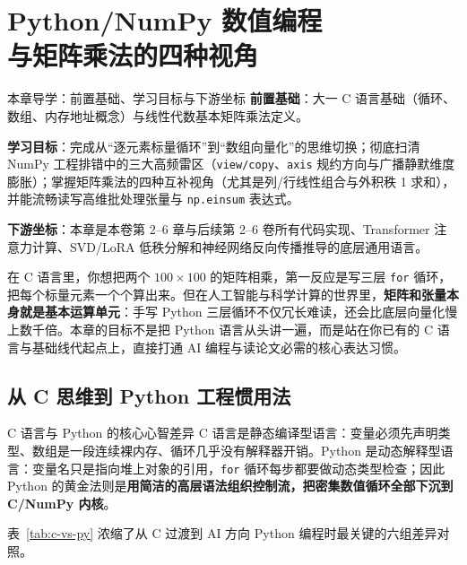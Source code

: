 \chapter[Python/NumPy 与矩阵乘法四视角]{Python/NumPy 数值编程\\与矩阵乘法的四种视角}\label{ch:numpy-matmul}


\begin{chapIntro}{本章导学：前置基础、学习目标与下游坐标}
\textbf{前置基础}：大一 C 语言基础（循环、数组、内存地址概念）与线性代数基本矩阵乘法定义。

\textbf{学习目标}：完成从“逐元素标量循环”到“数组向量化”的思维切换；彻底扫清 NumPy 工程排错中的三大高频雷区（\texttt{view/copy}、\texttt{axis} 规约方向与广播静默维度膨胀）；掌握矩阵乘法的四种互补视角（尤其是列/行线性组合与外积秩 1 求和），并能流畅读写高维批处理张量与 \texttt{np.einsum} 表达式。

\textbf{下游坐标}：本章是本卷第 2--6 章与后续第 2--6 卷所有代码实现、Transformer 注意力计算、SVD/LoRA 低秩分解和神经网络反向传播推导的底层通用语言。
\end{chapIntro}

在 C 语言里，你想把两个 $100 \times 100$ 的矩阵相乘，第一反应是写三层 \texttt{for} 循环，把每个标量元素一个个算出来。但在人工智能与科学计算的世界里，\textbf{矩阵和张量本身就是基本运算单元}：手写 Python 三层循环不仅冗长难读，还会比底层向量化慢上数千倍。本章的目标不是把 Python 语言从头讲一遍，而是站在你已有的 C 语言与基础线代起点上，直接打通 AI 编程与读论文必需的核心表达习惯。

\section{从 C 思维到 Python 工程惯用法}\label{sec:c-to-python}

\begin{recallBox}{C 语言与 Python 的核心心智差异}
C 语言是静态编译型语言：变量必须先声明类型、数组是一段连续裸内存、循环几乎没有解释器开销。Python 是动态解释型语言：变量名只是指向堆上对象的引用，\texttt{for} 循环每步都要做动态类型检查；因此 Python 的黄金法则是\textbf{用简洁的高层语法组织控制流，把密集数值循环全部下沉到 C/NumPy 内核}。
\end{recallBox}

表~\ref{tab:c-vs-py} 浓缩了从 C 过渡到 AI 方向 Python 编程时最关键的六组差异对照。

